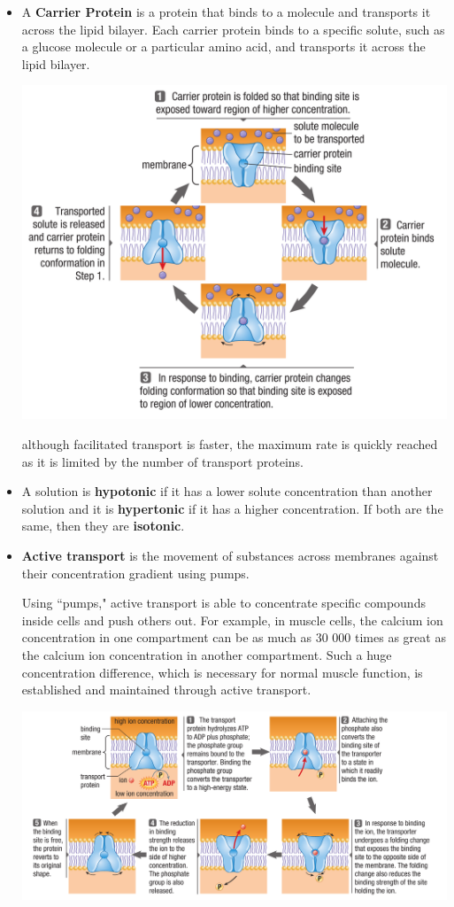 \documentclass[letterpaper]{article}
\numberwithin{equation}{section}
\theoremstyle{classic}
\begin{document}
\begin{itemize}
\item A \textbf{Carrier Protein} is a protein that binds to a molecule and transports it across the lipid bilayer. Each carrier protein binds to a specific solute, such as a glucose molecule or a particular amino acid, and transports it across the lipid bilayer.
\begin{center}\includegraphics[width=0.8\linewidth]{A18.PNG}\end{center}
although facilitated transport is faster, the maximum rate is quickly reached as it is limited by the number of transport proteins.
\item A solution is \textbf{hypotonic} if it has a lower solute concentration than another solution and it is \textbf{hypertonic} if it has a higher concentration. If both are the same, then they are \textbf{isotonic}.
\item \textbf{Active transport} is the movement of substances across membranes against their concentration gradient using pumps.
\begin{idea}
    Using ``pumps," active transport is able to concentrate specific compounds inside cells and push others out. For example, in muscle cells, the calcium ion concentration in one compartment can be as much as 30 000 times as great as the calcium ion concentration in another compartment. Such a huge concentration difference, which is necessary for normal muscle function, is established and maintained through active transport.
\end{idea}
\begin{center}\includegraphics[width=\linewidth]{A19.PNG}\end{center}

\end{itemize}
\end{document}
